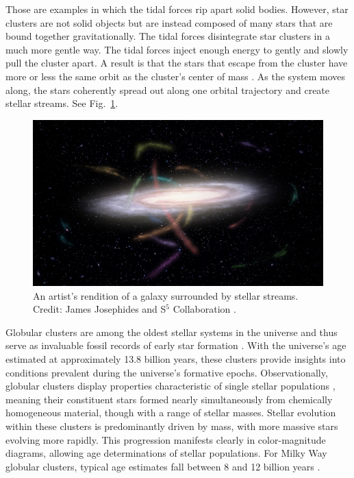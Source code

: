     Those are examples in which the tidal forces rip apart solid bodies. However, star clusters are not solid objects but are instead composed of many stars that are bound together gravitationally. The tidal forces disintegrate star clusters in a much more gentle way. The tidal forces inject enough energy to gently and slowly pull the cluster apart. A result is that the stars that escape from the cluster have more or less the same orbit as the cluster's center of mass \citep{1972ApJ...178..623T,1995AJ....109.2553G}. As the system moves along, the stars coherently spread out along one orbital trajectory and create stellar streams. See Fig.~\ref{fig:S5MilkywayStreams}. 

    \begin{figure}
        \centering
        \includegraphics[width=\linewidth]{images/S5MilkywayStreams.jpg}
        \caption{An artist's rendition of a galaxy surrounded by stellar streams. Credit: James Josephides and S$^5$ Collaboration \citep{2019MNRAS.490.3508L}.}
        \label{fig:S5MilkywayStreams}
    \end{figure}

    Globular clusters are among the oldest stellar systems in the universe and thus serve as invaluable fossil records of early star formation \citep{1992ApJ...400..265M}. With the universe's age estimated at approximately 13.8 billion years, these clusters provide insights into conditions prevalent during the universe's formative epochs. Observationally, globular clusters display properties characteristic of single stellar populations \citep{1970ApJ...162..841S}, meaning their constituent stars formed nearly simultaneously from chemically homogeneous material, though with a range of stellar masses. Stellar evolution within these clusters is predominantly driven by mass, with more massive stars evolving more rapidly. This progression manifests clearly in color-magnitude diagrams, allowing age determinations of stellar populations. For Milky Way globular clusters, typical age estimates fall between 8 and 12 billion years \citep{2013ApJ...775..134V}.

